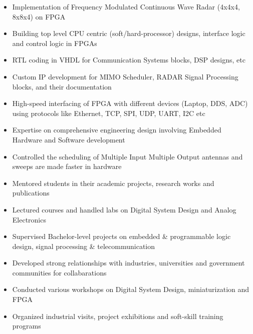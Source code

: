 \documentclass[10pt,a4paper,sans]{moderncv} %
\begin{document}
{\begin{itemize}
\item Implementation of Frequency Modulated Continuous Wave Radar (4x4x4, 8x8x4) on FPGA
\item Building top level CPU centric (soft/hard-processor) designs, interface logic and control logic in FPGAs
\item RTL coding in VHDL for Communication Systems blocks, DSP designs, etc
\item Custom IP development for MIMO Scheduler, RADAR Signal Processing blocks, and their documentation
\item High-speed interfacing of FPGA with different devices (Laptop, DDS, ADC) using protocols like Ethernet, TCP, SPI, UDP, UART, I2C etc
\item Expertise on comprehensive engineering design involving Embedded Hardware and Software development 
\end{itemize}}


{\begin{itemize}
\item Controlled the scheduling of Multiple Input Multiple Output antennas and sweeps are made faster in hardware
\end{itemize}}

{\begin{itemize}
\item Mentored students in their academic projects, research works and publications
\item Lectured courses and handled labs on Digital System Design and Analog Electronics
\item Supervised Bachelor-level projects on embedded \& programmable logic design, signal processing \& telecommunication  
\item Developed strong relationships with industries, universities and government communities for collabarations
\item Conducted various workshops on Digital System Design, miniaturization and FPGA
\item Organized industrial visits, project exhibitions and soft-skill training programs
\end{itemize}}
\end{document}
